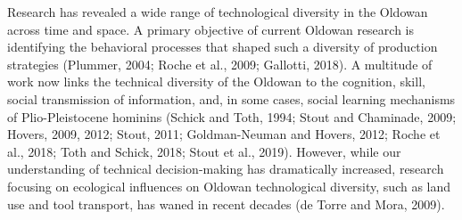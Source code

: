 \documentclass[]{elsarticle} %
\begin{document}
Research has revealed a wide range of technological diversity in the
Oldowan across time and space. A primary objective of current Oldowan
research is identifying the behavioral processes that shaped such a
diversity of production strategies (\hspace{0pt}Plummer,
2004\hspace{0pt}; \hspace{0pt}Roche et al., 2009\hspace{0pt};
\hspace{0pt}Gallotti, 2018\hspace{0pt}). A multitude of work now links
the technical diversity of the Oldowan to the cognition, skill, social
transmission of information, and, in some cases, social learning
mechanisms of Plio-Pleistocene hominins (\hspace{0pt}Schick and Toth,
1994\hspace{0pt}; \hspace{0pt}Stout and Chaminade, 2009\hspace{0pt};
\hspace{0pt}Hovers, 2009\hspace{0pt}, \hspace{0pt}2012\hspace{0pt};
\hspace{0pt}Stout, 2011\hspace{0pt}; \hspace{0pt}Goldman-Neuman and
Hovers, 2012\hspace{0pt}; \hspace{0pt}Roche et al., 2018\hspace{0pt};
\hspace{0pt}Toth and Schick, 2018\hspace{0pt}; \hspace{0pt}Stout et al.,
2019\hspace{0pt}). However, while our understanding of technical
decision-making has dramatically increased, research focusing on
ecological influences on Oldowan technological diversity, such as land
use and tool transport, has waned in recent decades (\hspace{0pt}de
Torre and Mora, 2009\hspace{0pt}).
\end{document}
